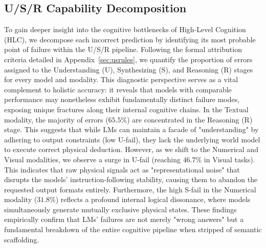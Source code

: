 \subsection{U/S/R Capability Decomposition}


To gain deeper insight into the cognitive bottlenecks of High-Level Cognition (HLC), we decompose each incorrect prediction by identifying its most probable point of failure within the U/S/R pipeline. Following the formal attribution criteria detailed in Appendix~\ref{sec:usrules}, we quantify the proportion of errors assigned to the Understanding (U), Synthesizing (S), and Reasoning (R) stages for every model and modality. This diagnostic perspective serves as a vital complement to holistic accuracy: it reveals that models with comparable performance may nonetheless exhibit fundamentally distinct failure modes, exposing unique fractures along their internal cognitive chains. In the Textual modality, the majority of errors ($65.5\%$) are concentrated in the Reasoning (R) stage. This suggests that while LMs can maintain a facade of "understanding" by adhering to output constraints (low U-fail), they lack the underlying world model to execute correct physical deduction. However, as we shift to the Numerical and Visual modalities, we observe a surge in U-fail (reaching $46.7\%$ in Visual tasks). This indicates that raw physical signals act as "representational noise" that disrupts the models' instruction-following stability, causing them to abandon the requested output formats entirely. Furthermore, the high S-fail in the Numerical modality ($31.8\%$) reflects a profound internal logical dissonance, where models simultaneously generate mutually exclusive physical states. These findings empirically confirm that LMs' failures are not merely "wrong answers" but a fundamental breakdown of the entire cognitive pipeline when stripped of semantic scaffolding.



